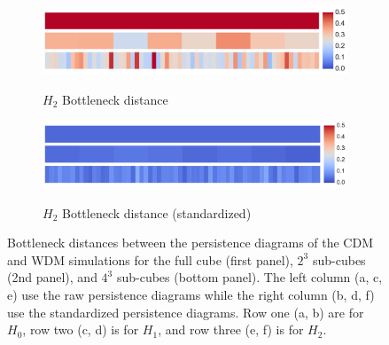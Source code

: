 \documentclass[12pt]{article}
\begin{document}
\begin{figure}[htp!]
\begin{subfigure}{.48\textwidth}
    \centering
    \caption{$H_2$ Bottleneck distance}
    \includegraphics[width=\linewidth]{fig_12_hmap_dim2_nonorm.pdf}
    \label{fig:cubeHeatmap2}
  \end{subfigure}
  \begin{subfigure}{.48\textwidth}
    \centering
    \caption{$H_2$ Bottleneck distance (standardized)}
    \includegraphics[width=\linewidth]{fig_12_hmap_dim2_yesnorm.pdf}
    \label{fig:cubeHeatmapStand2}
  \end{subfigure}
  \caption{Bottleneck distances between the persistence diagrams of the CDM and WDM simulations for the full cube (first panel), $2^3$ sub-cubes (2nd panel), and $4^3$ sub-cubes (bottom panel).  The left column (a, c, e) use the raw persistence diagrams while the right column (b, d, f) use the standardized persistence diagrams.  Row one (a, b) are for $H_0$, row two (c, d) is for $H_1$, and row three (e, f) is for $H_2$.
}
  \label{fig:cubeHeatmap}
\end{figure}
\end{document}

